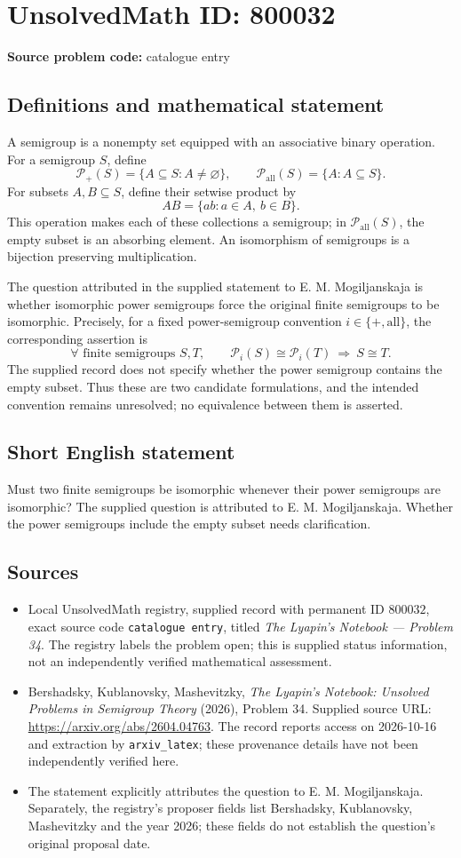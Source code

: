 \documentclass[11pt]{article}
\begin{document}
\section*{UnsolvedMath ID: 800032}
\textbf{Source problem code:} catalogue entry
\subsection{Definitions and mathematical statement}
A semigroup is a nonempty set equipped with an associative binary operation. For a semigroup \(S\), define
\[
\mathcal P_{+}(S)=\{A\subseteq S:A\ne\varnothing\},
\qquad
\mathcal P_{\mathrm{all}}(S)=\{A:A\subseteq S\}.
\]
For subsets \(A,B\subseteq S\), define their setwise product by
\[
AB=\{ab:a\in A,\ b\in B\}.
\]
This operation makes each of these collections a semigroup; in \(\mathcal P_{\mathrm{all}}(S)\), the empty subset is an absorbing element. An isomorphism of semigroups is a bijection preserving multiplication.

The question attributed in the supplied statement to E. M. Mogiljanskaja is whether isomorphic power semigroups force the original finite semigroups to be isomorphic. Precisely, for a fixed power-semigroup convention \(i\in\{+,\mathrm{all}\}\), the corresponding assertion is
\[
\forall\text{ finite semigroups }S,T,\qquad
\mathcal P_i(S)\cong\mathcal P_i(T)
\ \Longrightarrow\ S\cong T.
\]
The supplied record does not specify whether the power semigroup contains the empty subset. Thus these are two candidate formulations, and the intended convention remains unresolved; no equivalence between them is asserted.
\subsection{Short English statement}
Must two finite semigroups be isomorphic whenever their power semigroups are isomorphic? The supplied question is attributed to E. M. Mogiljanskaja. Whether the power semigroups include the empty subset needs clarification.
\subsection{Sources}
\begin{itemize}
\item Local UnsolvedMath registry, supplied record with permanent ID \(800032\), exact source code \texttt{catalogue entry}, titled \emph{The Lyapin's Notebook --- Problem 34}. The registry labels the problem open; this is supplied status information, not an independently verified mathematical assessment.
\item Bershadsky, Kublanovsky, Mashevitzky, \emph{The Lyapin's Notebook: Unsolved Problems in Semigroup Theory} (2026), Problem 34. Supplied source URL: \url{https://arxiv.org/abs/2604.04763}. The record reports access on 2026-10-16 and extraction by \texttt{arxiv\_latex}; these provenance details have not been independently verified here.
\item The statement explicitly attributes the question to E. M. Mogiljanskaja. Separately, the registry's proposer fields list Bershadsky, Kublanovsky, Mashevitzky and the year 2026; these fields do not establish the question's original proposal date.
\end{itemize}
\end{document}
